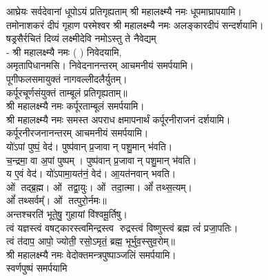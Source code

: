 \begin{center}

{आघ्रेयः सर्वदेवानां धूपोऽयं प्रतिगृह्यताम्}
श्री महालक्ष्म्यै नमः धूपमाघ्रापयामि।\\
 
{तमोनाशकरं दीपं गृहाण परमेश्वर}
श्री महालक्ष्म्यै नमः अलङ्कारदीपं सन्दर्शयामि।\\

{षड्रसैर्रचितं दिव्यं लक्ष्मीदेवि नमोऽस्तु ते}
नैवेद्यम्\\
- श्री महालक्ष्म्यै नमः (	) निवेदयामि, \\
अमृतापिधानमसि। निवेदनानन्तरम् आचमनीयं समर्पयामि।\\

पूगीफलसमायुक्तं नागवल्लीदलैर्युतम्।\\
कर्पूरचूर्णसंयुक्तं ताम्बूलं प्रतिगृह्यताम्॥\\
श्री महालक्ष्म्यै नमः कर्पूरताम्बूलं समर्पयामि।\\

श्री महालक्ष्म्यै नमः समस्त अपराध क्षमापनार्थं कर्पूरनीराजनं दर्शयामि।\\
कर्पूरनीरजनानन्तरम् आचमनीयं समर्पयामि।\\

 यो॑ऽपां पुष्पं॒ वेद॑। पुष्प॑वान् प्र॒जावान् पशु॒मान् भ॑वति।\\
च॒न्द्रमा॒ वा अ॒पां पुष्पम्। पुष्प॑वान् प्र॒जावान् पशु॒मान् भ॑वति।\\
य ए॒वं वेद॑। यो॑ऽपामा॒यत॑नं॒ वेद॑। आ॒यत॑नवान् भवति।\\

ओं तद्ब्र॒ह्म। ओं तद्वा॒युः। ओं तदा॒त्मा। ओं᳚ तथ्स॒त्यम्‌।\\
ओं᳚ तथ्सर्वम्᳚‌। ओं तत्पुरो॒र्नमः॥\\

अन्तश्चरति॑ भूते॒षु॒ गुहायां वि॑श्वमू॒र्तिषु। \\
त्वं यज्ञस्त्वं वषट्कारस्त्वमिन्द्रस्त्व रुद्रस्त्वं विष्णुस्त्वं ब्रह्म त्वं॑ प्रजा॒पतिः। \\
त्वं त॑दाप॒ आपो॒ ज्योती॒ रसो॒ऽमृतं॒ ब्रह्म॒ भूर्भुव॒स्सुव॒रोम्‌॥\\

श्री महालक्ष्म्यै नमः वेदोक्तमन्त्रपुष्पाञ्जलिं समर्पयामि।\\

स्वर्णपुष्पं समर्पयामि\\
 

\end{center}
